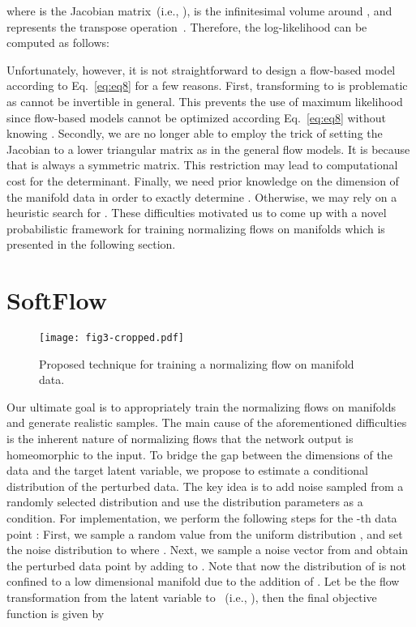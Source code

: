 \documentclass{article}
\begin{document}
where  is the  Jacobian matrix~(i.e., ),  is the infinitesimal volume around , and  represents the transpose operation~\citep{gemici2016normalizing, ben1999change}. Therefore, the log-likelihood  can be computed as follows:


Unfortunately, however, it is not straightforward to design a flow-based model according to Eq.~\eqref{eq:eq8} for a few reasons. First, transforming  to  is problematic as  cannot be invertible in general. This prevents the use of maximum likelihood since flow-based models cannot be optimized according Eq.~\eqref{eq:eq8} without knowing . Secondly, we are no longer able to employ the trick of setting the Jacobian to a lower triangular matrix as in the general flow models. It is because that  is always a symmetric matrix. This restriction may lead to  computational cost for the determinant. Finally, we need prior knowledge on the dimension of the manifold data in order to exactly determine . Otherwise, we may rely on a heuristic search for . These difficulties motivated us to come up with a novel probabilistic framework for training normalizing flows on manifolds which is presented in the following section.


\section{SoftFlow}
\begin{figure}[t]
	\centering
	\texttt{[image: fig3-cropped.pdf]}
    \caption{Proposed technique for training a normalizing flow on manifold data.}
	\label{fig:fig3}
\end{figure}

Our ultimate goal is to appropriately train the normalizing flows on manifolds and generate realistic samples. The main cause of the aforementioned difficulties is the inherent nature of normalizing flows that the network output is homeomorphic to the input. To bridge the gap between the dimensions of the data and the target latent variable, we propose to estimate a conditional distribution of the perturbed data. The key idea is to add noise sampled from a randomly selected distribution and use the distribution parameters as a condition. For implementation, we perform the following steps for the -th data point : First, we sample a random value  from the uniform distribution , and set the noise distribution to  where . Next, we sample a noise vector  from  and obtain the perturbed data point  by adding  to . Note that now the distribution of  is not confined to a low dimensional manifold due to the addition of . Let  be the flow transformation from the latent variable  to ~(i.e., ), then the final objective function is given by
\end{document}
